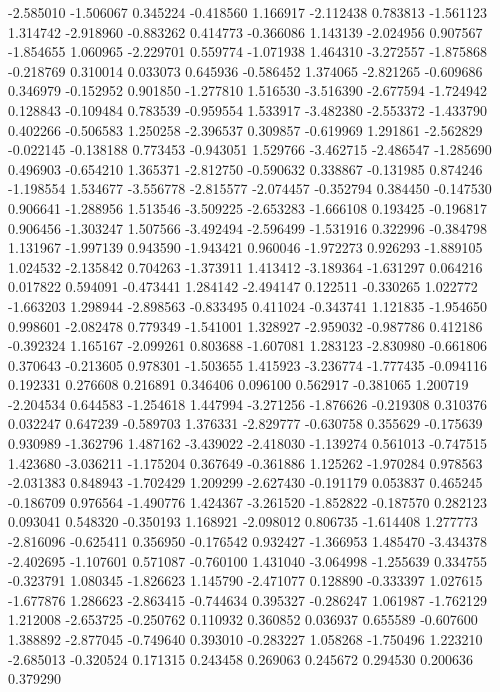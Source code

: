 -2.585010
-1.506067
0.345224
-0.418560
1.166917
-2.112438
0.783813
-1.561123
1.314742
-2.918960
-0.883262
0.414773
-0.366086
1.143139
-2.024956
0.907567
-1.854655
1.060965
-2.229701
0.559774
-1.071938
1.464310
-3.272557
-1.875868
-0.218769
0.310014
0.033073
0.645936
-0.586452
1.374065
-2.821265
-0.609686
0.346979
-0.152952
0.901850
-1.277810
1.516530
-3.516390
-2.677594
-1.724942
0.128843
-0.109484
0.783539
-0.959554
1.533917
-3.482380
-2.553372
-1.433790
0.402266
-0.506583
1.250258
-2.396537
0.309857
-0.619969
1.291861
-2.562829
-0.022145
-0.138188
0.773453
-0.943051
1.529766
-3.462715
-2.486547
-1.285690
0.496903
-0.654210
1.365371
-2.812750
-0.590632
0.338867
-0.131985
0.874246
-1.198554
1.534677
-3.556778
-2.815577
-2.074457
-0.352794
0.384450
-0.147530
0.906641
-1.288956
1.513546
-3.509225
-2.653283
-1.666108
0.193425
-0.196817
0.906456
-1.303247
1.507566
-3.492494
-2.596499
-1.531916
0.322996
-0.384798
1.131967
-1.997139
0.943590
-1.943421
0.960046
-1.972273
0.926293
-1.889105
1.024532
-2.135842
0.704263
-1.373911
1.413412
-3.189364
-1.631297
0.064216
0.017822
0.594091
-0.473441
1.284142
-2.494147
0.122511
-0.330265
1.022772
-1.663203
1.298944
-2.898563
-0.833495
0.411024
-0.343741
1.121835
-1.954650
0.998601
-2.082478
0.779349
-1.541001
1.328927
-2.959032
-0.987786
0.412186
-0.392324
1.165167
-2.099261
0.803688
-1.607081
1.283123
-2.830980
-0.661806
0.370643
-0.213605
0.978301
-1.503655
1.415923
-3.236774
-1.777435
-0.094116
0.192331
0.276608
0.216891
0.346406
0.096100
0.562917
-0.381065
1.200719
-2.204534
0.644583
-1.254618
1.447994
-3.271256
-1.876626
-0.219308
0.310376
0.032247
0.647239
-0.589703
1.376331
-2.829777
-0.630758
0.355629
-0.175639
0.930989
-1.362796
1.487162
-3.439022
-2.418030
-1.139274
0.561013
-0.747515
1.423680
-3.036211
-1.175204
0.367649
-0.361886
1.125262
-1.970284
0.978563
-2.031383
0.848943
-1.702429
1.209299
-2.627430
-0.191179
0.053837
0.465245
-0.186709
0.976564
-1.490776
1.424367
-3.261520
-1.852822
-0.187570
0.282123
0.093041
0.548320
-0.350193
1.168921
-2.098012
0.806735
-1.614408
1.277773
-2.816096
-0.625411
0.356950
-0.176542
0.932427
-1.366953
1.485470
-3.434378
-2.402695
-1.107601
0.571087
-0.760100
1.431040
-3.064998
-1.255639
0.334755
-0.323791
1.080345
-1.826623
1.145790
-2.471077
0.128890
-0.333397
1.027615
-1.677876
1.286623
-2.863415
-0.744634
0.395327
-0.286247
1.061987
-1.762129
1.212008
-2.653725
-0.250762
0.110932
0.360852
0.036937
0.655589
-0.607600
1.388892
-2.877045
-0.749640
0.393010
-0.283227
1.058268
-1.750496
1.223210
-2.685013
-0.320524
0.171315
0.243458
0.269063
0.245672
0.294530
0.200636
0.379290
